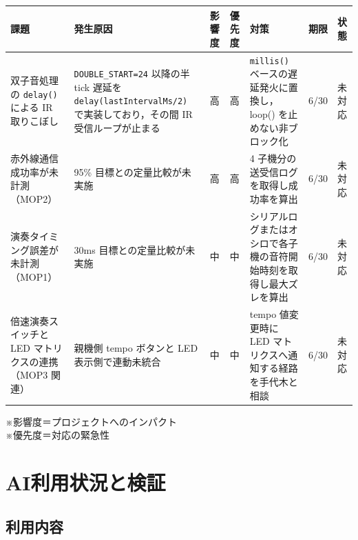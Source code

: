 \documentclass[a4paper,11pt]{ltjsarticle}
\providecommand{\％}{\%}
\begin{document}
\begingroup
\setlength{\tabcolsep}{3pt}
\sloppy
{\footnotesize
\begin{longtable}{|p{2.6cm}|p{3.2cm}|p{0.9cm}|p{0.9cm}|p{3.4cm}|p{1.3cm}|p{1.3cm}|}
\hline
\rowcolor[gray]{0.9}
課題 & 発生原因 & 影響度 & 優先度 & 対策 & 期限 & 状態 \\
\hline
双子音処理の \texttt{delay()} による IR 取りこぼし & \texttt{DOUBLE\_\-START=24} 以降の半 tick 遅延を \texttt{delay(last\-Interval\-Ms/2)} で実装しており，その間 IR 受信ループが止まる & 高 & 高 & \texttt{millis()} ベースの遅延発火に置換し，loop() を止めない非ブロック化 & 6/30 & 未対応 \\
\hline
赤外線通信成功率が未計測（MOP2） & 95\% 目標との定量比較が未実施 & 高 & 高 & 4 子機分の送受信ログを取得し成功率を算出 & 6/30 & 未対応 \\
\hline
演奏タイミング誤差が未計測（MOP1） & 30ms 目標との定量比較が未実施 & 中 & 中 & シリアルログまたはオシロで各子機の音符開始時刻を取得し最大ズレを算出 & 6/30 & 未対応 \\
\hline
倍速演奏スイッチと LED マトリクスの連携（MOP3 関連） & 親機側 tempo ボタンと LED 表示側で連動未統合 & 中 & 中 & tempo 値変更時に LED マトリクスへ通知する経路を手代木と相談 & 6/30 & 未対応 \\
\hline
\end{longtable}
}
\endgroup

\vspace{0.5em}
※影響度＝プロジェクトへのインパクト\\
※優先度＝対応の緊急性

\section{AI利用状況と検証}\label{sec:ai}

\subsection{利用内容}\label{sec:ai-use}
\end{document}

